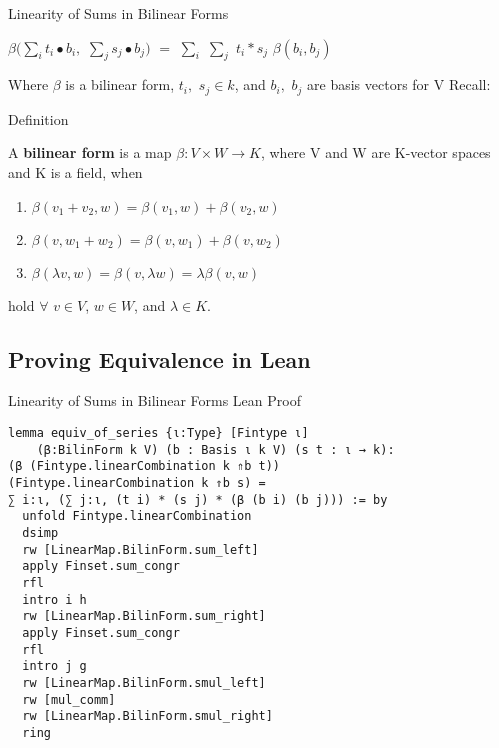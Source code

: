 \documentclass[svgnames]{beamer}
\begin{document}
\begin{frame}{Linearity of Sums in Bilinear Forms}
\begin{Lemma}
$\beta (\sum\limits_{i} t_i \bullet b_i ,$ $\sum\limits_{j} s_j \bullet b_j)$ $=$ $\sum\limits_{i}$ $\sum\limits_{j}$ $t_i*s_j$ $\beta (b_i , b_j)$
\end{Lemma}
{\footnotesize
Where $\beta$ is a bilinear form, $t_i,$ $s_j \in k$, and $b_i,$ $b_j$ are basis vectors for V
}
\pause
Recall:
\begin{block}{Definition}
{\footnotesize
A \textbf {bilinear form} is a map $\beta : V\times W \to K $, where V and W are K-vector spaces and K is a field, when
\begin{enumerate}
    \item $\beta (v_1 + v_2 , w) = \beta (v_1 , w) +\beta ( v_2,w)$
    \item $\beta ( v, w_1 + w_2) = \beta (v,w_1) +\beta (v , w_2)$
    \item $\beta(\lambda v, w) = \beta (v, \lambda w) = \lambda \beta (v , w)$
\end{enumerate}
hold $\forall$ $v\in V$, $w\in W$, and $\lambda \in K$.
}
\end{block}
\end{frame}

\subsection{Proving Equivalence in Lean}
\begin{frame}[label={sec:proof_comparison},fragile]{Linearity of Sums in Bilinear Forms Lean Proof}
\begin{itemize}
\end{itemize}
{\scriptsize
\begin{verbatim}
lemma equiv_of_series {ι:Type} [Fintype ι] 
    (β:BilinForm k V) (b : Basis ι k V) (s t : ι → k): 
(β (Fintype.linearCombination k ⇑b t)) 
(Fintype.linearCombination k ⇑b s) =
∑ i:ι, (∑ j:ι, (t i) * (s j) * (β (b i) (b j))) := by
  unfold Fintype.linearCombination
  dsimp
  rw [LinearMap.BilinForm.sum_left]
  apply Finset.sum_congr
  rfl
  intro i h
  rw [LinearMap.BilinForm.sum_right]
  apply Finset.sum_congr
  rfl
  intro j g
  rw [LinearMap.BilinForm.smul_left]
  rw [mul_comm]
  rw [LinearMap.BilinForm.smul_right]
  ring
\end{verbatim}
}
\end{frame}


\end{document}
